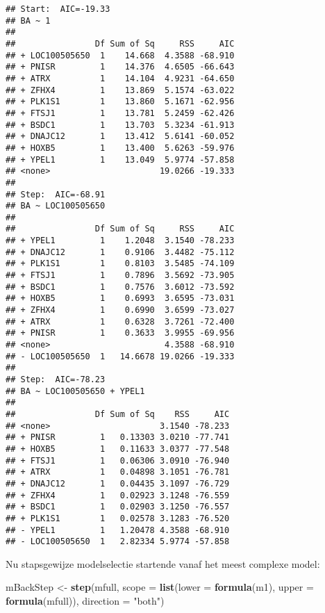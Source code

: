 \documentclass[12pt,dutch,coursenotes]{book}
\newenvironment{Shaded}{\begin{snugshade}}{\end{snugshade}}
\newcommand{\KeywordTok}[1]{\textcolor[rgb]{0.13,0.29,0.53}{\textbf{#1}}}
\newcommand{\DataTypeTok}[1]{\textcolor[rgb]{0.13,0.29,0.53}{#1}}
\newcommand{\StringTok}[1]{\textcolor[rgb]{0.31,0.60,0.02}{#1}}
\newcommand{\NormalTok}[1]{#1}
\theoremstyle{definition}
\theoremstyle{definition}
\theoremstyle{definition}
\theoremstyle{remark}
\begin{document}
\begin{verbatim}
## Start:  AIC=-19.33
## BA ~ 1
## 
##                Df Sum of Sq     RSS     AIC
## + LOC100505650  1    14.668  4.3588 -68.910
## + PNISR         1    14.376  4.6505 -66.643
## + ATRX          1    14.104  4.9231 -64.650
## + ZFHX4         1    13.869  5.1574 -63.022
## + PLK1S1        1    13.860  5.1671 -62.956
## + FTSJ1         1    13.781  5.2459 -62.426
## + BSDC1         1    13.703  5.3234 -61.913
## + DNAJC12       1    13.412  5.6141 -60.052
## + HOXB5         1    13.400  5.6263 -59.976
## + YPEL1         1    13.049  5.9774 -57.858
## <none>                      19.0266 -19.333
## 
## Step:  AIC=-68.91
## BA ~ LOC100505650
## 
##                Df Sum of Sq     RSS     AIC
## + YPEL1         1    1.2048  3.1540 -78.233
## + DNAJC12       1    0.9106  3.4482 -75.112
## + PLK1S1        1    0.8103  3.5485 -74.109
## + FTSJ1         1    0.7896  3.5692 -73.905
## + BSDC1         1    0.7576  3.6012 -73.592
## + HOXB5         1    0.6993  3.6595 -73.031
## + ZFHX4         1    0.6990  3.6599 -73.027
## + ATRX          1    0.6328  3.7261 -72.400
## + PNISR         1    0.3633  3.9955 -69.956
## <none>                       4.3588 -68.910
## - LOC100505650  1   14.6678 19.0266 -19.333
## 
## Step:  AIC=-78.23
## BA ~ LOC100505650 + YPEL1
## 
##                Df Sum of Sq    RSS     AIC
## <none>                      3.1540 -78.233
## + PNISR         1   0.13303 3.0210 -77.741
## + HOXB5         1   0.11633 3.0377 -77.548
## + FTSJ1         1   0.06306 3.0910 -76.940
## + ATRX          1   0.04898 3.1051 -76.781
## + DNAJC12       1   0.04435 3.1097 -76.729
## + ZFHX4         1   0.02923 3.1248 -76.559
## + BSDC1         1   0.02903 3.1250 -76.557
## + PLK1S1        1   0.02578 3.1283 -76.520
## - YPEL1         1   1.20478 4.3588 -68.910
## - LOC100505650  1   2.82334 5.9774 -57.858
\end{verbatim}

Nu stapsgewijze modelselectie startende vanaf het meest complexe model:

\begin{Shaded}
\begin{Highlighting}[]
\NormalTok{mBackStep <-}\StringTok{ }\KeywordTok{step}\NormalTok{(mfull, }\DataTypeTok{scope =} \KeywordTok{list}\NormalTok{(}\DataTypeTok{lower =} \KeywordTok{formula}\NormalTok{(m1), }
    \DataTypeTok{upper =} \KeywordTok{formula}\NormalTok{(mfull)), }\DataTypeTok{direction =} \StringTok{"both"}\NormalTok{)}
\end{Highlighting}
\end{Shaded}
\end{document}
